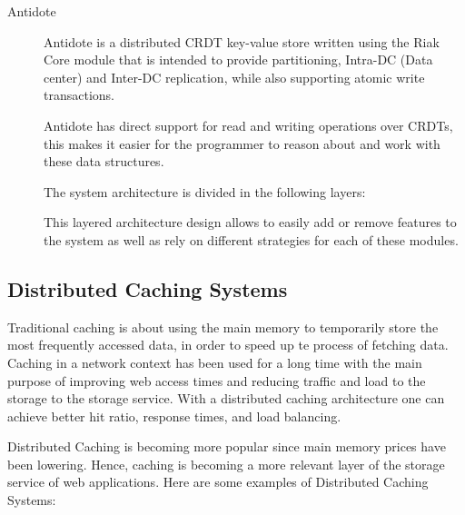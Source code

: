 \begin{description}
\item[Antidote]\cite{site_antidote} Antidote is a distributed CRDT key-value store written using the Riak Core module that is intended to provide partitioning, Intra-DC (Data center) and Inter-DC replication, while also supporting atomic write transactions.\par
	Antidote has direct support for read and writing operations over CRDTs, this makes it easier for the programmer to reason about and work with these data structures.\par
	The system architecture is divided in the following layers: 
\par
	This layered architecture design allows to easily add or remove features to the system as well as rely on different strategies for each of these modules.

\end{description}

\subsection{Distributed Caching Systems}
\label{sec:distributed_caching_systems}
Traditional caching is about using the main memory to temporarily store the most frequently accessed data, in order to speed up te process of fetching data. Caching in a network context has been used for a long time with the main purpose of improving web access times and reducing traffic and load to the storage to the storage service. With a distributed caching architecture one can achieve better hit ratio, response times, and load balancing\cite{distributed_caching}.\par
	Distributed Caching is becoming more popular since main memory prices have been lowering. Hence, caching is becoming a more relevant layer of the storage service of web applications. Here are some examples of Distributed Caching Systems:
	
